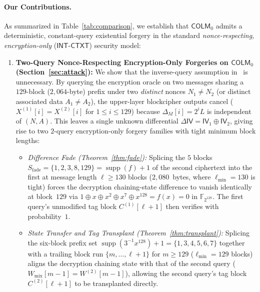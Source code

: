 \documentclass[11pt,a4paper]{article}
\theoremstyle{definition}
\theoremstyle{remark}
\newcommand{\FtwoN}{\mathbb{F}_{2^{128}}}
\newcommand{\COLMzero}{\mathsf{COLM}_0}
\newcommand{\IV}{\mathsf{IV}}
\newcommand{\supp}{\operatorname{supp}}
\begin{document}
\paragraph{Our Contributions.}
As summarized in Table~\ref{tab:comparison}, we establish that $\COLMzero$ admits a deterministic, constant-query existential forgery in the standard \emph{nonce-respecting, encryption-only} ($\mathsf{INT\text{-}CTXT}$) security model:
\begin{enumerate}[leftmargin=2em]
    \item \textbf{Two-Query Nonce-Respecting Encryption-Only Forgeries on $\COLMzero$ (Section~\ref{sec:attack}):} We show that the inverse-query assumption in~\cite[Section~6]{DLMN17} is unnecessary. By querying the encryption oracle on two messages sharing a $129$-block ($2{,}064$-byte) prefix under two \emph{distinct} nonces $N_1 \neq N_2$ (or distinct associated data $A_1 \neq A_2$), the upper-layer blockcipher outputs cancel ($X^{(1)}[i] = X^{(2)}[i]$ for $1 \le i \le 129$) because $\Delta_M[i] = 2^i L$ is independent of $(N, A)$. This leaves a single unknown differential $\Delta\IV = \IV_1 \oplus \IV_2$, giving rise to two $2$-query encryption-only forgery families with tight minimum block lengths:
    \begin{itemize}
        \item \emph{Difference Fade (Theorem~\ref{thm:fade}):} Splicing the $5$ blocks $S_{\mathrm{fade}} = \{1, 2, 3, 8, 129\} = \supp(f) + 1$ of the second ciphertext into the first at message length $\ell \ge 130$ blocks ($2{,}080$~bytes, where $\ell_{\min} = 130$ is tight) forces the decryption chaining-state difference to vanish identically at block~$129$ via $1 \oplus x \oplus x^2 \oplus x^7 \oplus x^{128} = f(x) = 0$ in $\FtwoN$. The first query's unmodified tag block $C^{(1)}[\ell+1]$ then verifies with probability~$1$.
        \item \emph{State Transfer and Tag Transplant (Theorem~\ref{thm:transplant}):} Splicing the six-block prefix set $\supp(3^{-1}x^{128}) + 1 = \{1, 3, 4, 5, 6, 7\}$ together with a trailing block run $\{m, \dots, \ell+1\}$ for $m \ge 129$ ($\ell_{\min} = 129$ blocks) aligns the decryption chaining state with that of the second query ($W_{\mathrm{mix}}[m-1] = W^{(2)}[m-1]$), allowing the second query's tag block $C^{(2)}[\ell+1]$ to be transplanted directly.
    \end{itemize}

\end{enumerate}
\end{document}
